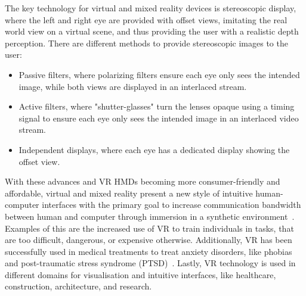 The key technology for virtual and mixed reality devices is stereoscopic display, where the left and right eye are
provided with offset views, imitating the real world view on a virtual scene, and thus providing the user with a
realistic depth perception.
There are different methods to provide stereoscopic images to the user:
\begin{itemize}
    \item Passive filters, where polarizing filters ensure each eye only sees the intended image, while both views
    are displayed in an interlaced stream.
    \item Active filters, where "shutter-glasses" turn the lenses opaque using a timing signal to ensure each eye
    only sees the intended image in an interlaced video stream.
    \item Independent displays, where each eye has a dedicated display showing the offset view.
\end{itemize}

With these advances and VR HMDs becoming more consumer-friendly and affordable, virtual and mixed reality present a
new style of intuitive human-computer interfaces with the primary goal to increase communication bandwidth between
human and computer through immersion in a synthetic environment~\cite{Davis2014}.
Examples of this are the increased use of VR to train individuals in tasks, that are too difficult, dangerous, or
expensive otherwise.
Additionally, VR has been successfully used in medical treatments to treat anxiety disorders, like phobias and
post-traumatic stress syndrome (PTSD)~\cite{Clifton2020}.
Lastly, VR technology is used in different domains for visualisation and intuitive interfaces, like healthcare,
construction, architecture, and research.

